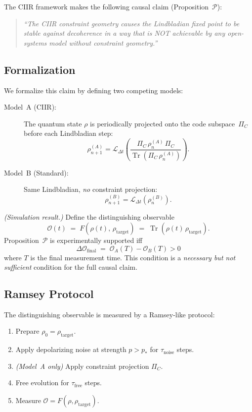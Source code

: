 The CIIR framework makes the following causal claim (Proposition~$\mathcal{P}$):

\begin{quotation}
\noindent\textit{``The CIIR constraint geometry causes the Lindbladian fixed
point to be stable against decoherence in a way that is NOT achievable by
any open-systems model without constraint geometry.''}
\end{quotation}

\subsection{Formalization}

We formalize this claim by defining two competing models:
\begin{description}
  \item[Model~A (CIIR):] The quantum state $\rho$ is periodically projected
    onto the code subspace~$\Pi_C$ before each Lindbladian step:
    \[
      \rho_{n+1}^{(A)} =
        \mathcal{L}_{\Delta t}\!\left(
          \frac{\Pi_C\,\rho_n^{(A)}\,\Pi_C}{\operatorname{Tr}(\Pi_C\,\rho_n^{(A)})}
        \right).
    \]
  \item[Model~B (Standard):] Same Lindbladian, \emph{no} constraint
    projection:
    \[
      \rho_{n+1}^{(B)} = \mathcal{L}_{\Delta t}(\rho_n^{(B)}).
    \]
\end{description}

\begin{theorem}\label{thm:ch22-causal}
  \emph{(Simulation result.)}
  Define the distinguishing observable
  \[
    \mathcal{O}(t) \;=\; F(\rho(t),\,\rho_{\mathrm{target}})
    \;=\; \operatorname{Tr}(\rho(t)\,\rho_{\mathrm{target}}).
  \]
  Proposition~$\mathcal{P}$ is experimentally supported iff
  \[
    \Delta\mathcal{O}_{\mathrm{final}}
    \;=\;
    \mathcal{O}_A(T) - \mathcal{O}_B(T) > 0
  \]
  where $T$ is the final measurement time.  This condition is a
  \emph{necessary but not sufficient} condition for the full causal claim.
\end{theorem}

\subsection{Ramsey Protocol}

The distinguishing observable is measured by a Ramsey-like protocol:
\begin{enumerate}
  \item Prepare $\rho_0 = \rho_{\mathrm{target}}$.
  \item Apply depolarizing noise at strength $p > p_*$ for $\tau_{\mathrm{noise}}$ steps.
  \item \emph{(Model~A only)} Apply constraint projection $\Pi_C$.
  \item Free evolution for $\tau_{\mathrm{free}}$ steps.
  \item Measure $\mathcal{O} = F(\rho, \rho_{\mathrm{target}})$.
\end{enumerate}


